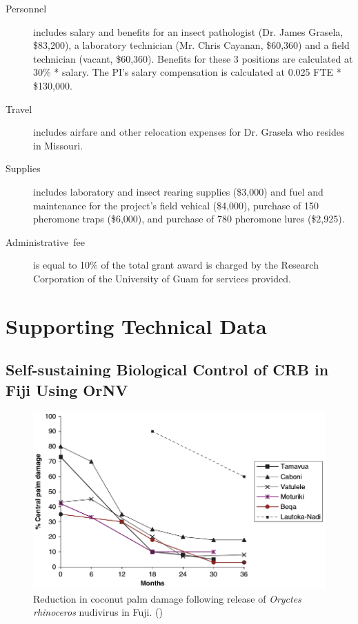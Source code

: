 \documentclass[12pt,letterpaper,english,bibliography=totocnumbered, abstract=on]{scrartcl}
\begin{document}
\begin{description}
	
\item [{Personnel}] includes salary and benefits for an insect pathologist (Dr. James Grasela, \$83,200), 
a laboratory technician (Mr. Chris Cayanan, \$60,360) and a field technician (vacant, \$60,360). Benefits for these 3 positions are calculated at 30\% * salary. The PI's salary compensation is calculated at 0.025 FTE * \$130,000.

\item [{Travel}] includes airfare and other relocation expenses for Dr. Grasela who resides in Missouri.

\item [{Supplies}] includes laboratory and insect rearing supplies (\$3,000) and fuel and maintenance for the project's field vehical (\$4,000), purchase of 150 pheromone traps (\$6,000), and purchase of 780 pheromone lures (\$2,925). 

\item [{Administrative~fee}] is equal to 10\% of the total grant award
is charged by the Research Corporation of the University of Guam for
services provided.

\end{description}

\printbibliography

\newpage{}

%

\newpage{}

\appendix

\section{Supporting Technical Data}

\subsection{Self-sustaining Biological Control of CRB in Fiji Using OrNV}
\label{sub: fiji}

\begin{figure}[h]
\centering
\includegraphics[width=0.7\linewidth]{images/fiji}
\caption{Reduction in coconut palm damage following release of \textit{Oryctes rhinoceros} nudivirus in Fuji. (\cite{jackson_use_2009-1})}
\label{fig:fiji}
\end{figure}
\end{document}
